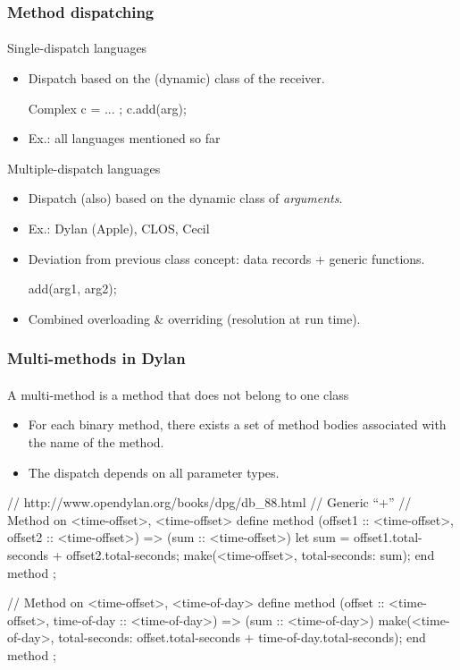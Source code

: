 \documentclass{beamer}
\begin{document}
\begin{frame}[fragile]
\frametitle{Method dispatching}
\framesubtitle{}

Single-dispatch languages
\begin{itemize}
\item Dispatch based on the (dynamic) class of the receiver. 
\begin{cplus3}
     Complex c = ... ;   
     c.add(arg);
\end{cplus3}
\item Ex.: all languages mentioned so far

\end{itemize}

Multiple-dispatch languages
\begin{itemize}
\item Dispatch (also) based on the dynamic class of \textit{arguments}.
\item Ex.: Dylan (Apple), CLOS, Cecil
\item Deviation from previous class concept: data records + generic functions.
\begin{cplus3}
     add(arg1, arg2);
\end{cplus3}
\item Combined overloading \& overriding (resolution at run time).
\end{itemize} 
\end{frame}

\begin{frame}[fragile]
\frametitle{Multi-methods in Dylan}
\framesubtitle{}
A multi-method is a method that does not belong to one class
\begin{itemize}
\item For each binary method, there exists
a set of method bodies associated with the name of the method.
\item The dispatch depends on all parameter types.
\end{itemize}
\begin{cplus3}
// http://www.opendylan.org/books/dpg/db_88.html
// Generic ``+'' 
// Method on <time-offset>, <time-offset>
define method \+
    (offset1 :: <time-offset>, offset2 :: <time-offset>)
=> (sum :: <time-offset>)
 let sum = offset1.total-seconds + offset2.total-seconds;
 make(<time-offset>, total-seconds: sum);
end method \+;	

// Method on <time-offset>, <time-of-day>
define method \+ 
    (offset :: <time-offset>, time-of-day :: <time-of-day>)
 => (sum :: <time-of-day>)
  make(<time-of-day>, 
       total-seconds: offset.total-seconds + time-of-day.total-seconds);
end method \+;
\end{cplus3}
\end{frame}
\end{document}
